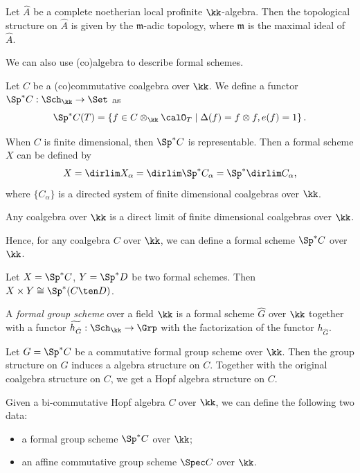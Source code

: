 \begin{remark}
	Let $\hat{A}$ be a complete noetherian local profinite $\kk$-algebra.
	Then the topological structure on $\hat{A}$ is given by the $\mathfrak{m}$-adic topology, where $\mathfrak{m}$ is the maximal ideal of $\hat{A}$.
\end{remark}

We can also use (co)algebra to describe formal schemes.

\begin{definition}
	Let $C$ be a (co)commutative coalgebra over $\kk$.
	We define a functor $\Sp^* C: \Sch_\kk \to \Set$ as
	\[ \Sp^* C (T) = \left\{ f \in C \otimes_\kk \calO_T \mid \Delta(f) = f \otimes f, e(f) = 1 \right\}. \]
\end{definition}

When $C$ is finite dimensional, then $\Sp^* C$ is representable.
Then a formal scheme $X$ can be defined by
\[ X = \dirlim X_\alpha = \dirlim \Sp^* C_\alpha = \Sp^* \dirlim C_\alpha, \]
where $\{C_\alpha\}$ is a directed system of finite dimensional coalgebras over $\kk$.

\begin{theorem}
	Any coalgebra over $\kk$ is a direct limit of finite dimensional coalgebras over $\kk$.
\end{theorem}

Hence, for any coalgebra $C$ over $\kk$, we can define a formal scheme $\Sp^* C$ over $\kk$.

\begin{remark}
	Let $X = \Sp^* C$, $Y = \Sp^* D$ be two formal schemes.
	Then $X \times Y \cong \Sp^* (C \ten D)$.
\end{remark}


\begin{definition}
	A \emph{formal group scheme} over a field $\kk$ is a formal scheme $\hat{G}$ over $\kk$ together with a functor $\widetilde{h_{\hat{G}}}: \Sch_\kk \to \Grp$ with the factorization of the functor $h_{\hat{G}}$.
\end{definition}

Let $G = \Sp^* C$ be a commutative formal group scheme over $\kk$.
Then the group structure on $G$ induces a algebra structure on $C$.
Together with the original coalgebra structure on $C$, we get a Hopf algebra structure on $C$.

Given a bi-commutative Hopf algebra $C$ over $\kk$, we can define the following two data:
\begin{itemize}
	\item a formal group scheme $\Sp^* C$ over $\kk$;
	\item an affine commutative group scheme $\Spec C$ over $\kk$.
\end{itemize}

